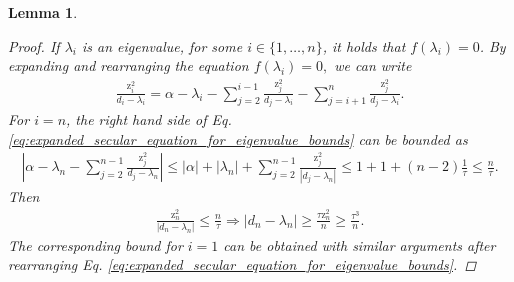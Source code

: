 \documentclass{article}
\newcommand{\labs}{\left|}
\newcommand{\rabs}{\right|}
\newtheorem{lemma}{Lemma}[section]
\newcommand\vecz{\boldsymbol{\mathrm{z}}}
\begin{document}
\begin{lemma}
\begin{proof}
    If $\lambda_i$ is an eigenvalue, for some $i\in\{1,\dots,n\}$, it holds that $f(\lambda_i)=0$. By expanding and rearranging the equation $f(\lambda_i)=0,$ we can write
        \begin{align}
            \label{eq:expanded_secular_equation_for_eigenvalue_bounds}
            \frac{\vecz_i^2}{d_i-\lambda_i} 
            = 
            \alpha 
            - 
            \lambda_i 
            -
            \sum_{j=2}^{i-1}
            \frac{\vecz_j^2}{d_j-\lambda_i}
            -
            \sum_{j=i+1}^{n}
            \frac{\vecz_j^2}{d_j-\lambda_i}.
        \end{align}
    For $i=n$, the right hand side of Eq. \eqref{eq:expanded_secular_equation_for_eigenvalue_bounds} can be bounded as
    \begin{align*}
            \labs
                \alpha 
                - 
                \lambda_n 
                -
                \sum_{j=2}^{n-1}
                \frac{\vecz_j^2}{d_j-\lambda_n}
            \rabs
            \leq
            |\alpha| + |\lambda_n| + \sum_{j=2}^{n-1}\frac{\vecz_j^2}{|d_j-\lambda_n|}
            \leq
            1 + 1 + (n-2)\frac{1}{\tau}
            \leq
            \frac{n}{\tau}
            .
        \end{align*}
        Then
        \begin{align*}
            \frac{\vecz_n^2}{|d_n-\lambda_n|} \leq \frac{n}{\tau}
            \Rightarrow
            |d_n-\lambda_n| \geq \frac{\tau\vecz_n^2}{n} \geq \frac{\tau^3}{n}.
        \end{align*}
    The corresponding bound for $i=1$ can be obtained with similar arguments after rearranging Eq. \eqref{eq:expanded_secular_equation_for_eigenvalue_bounds}.
    

\end{proof}
\end{lemma}
\end{document}
